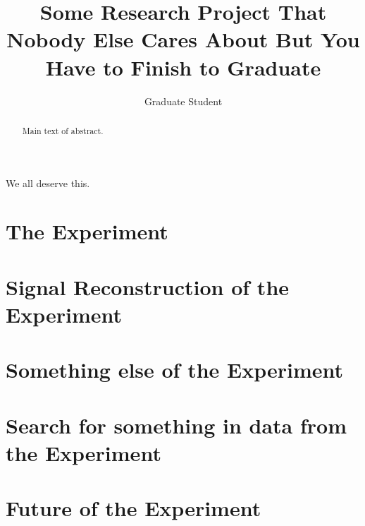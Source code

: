 \documentclass[letterpaper,12pt,twoside]{ruthesis}
\title{Some Research Project That Nobody Else Cares About But You Have to Finish to Graduate}
\author{Graduate Student}
\begin{document}
\begin{frontmatter}
\maketitle
\begin{abstract}
    Main text of abstract.
\end{abstract}
% 
\begin{acknowledge}
    We all deserve this. 
\end{acknowledge}
\tableofcontents
\end{frontmatter}
  
  




\chapter{The Experiment}

\chapter{Signal Reconstruction of the Experiment}

\chapter{Something else of the Experiment}

\chapter{Search for something in data from the Experiment}

\chapter{Future of the Experiment}


\nocite{*}
\printbibliography
\end{document}
